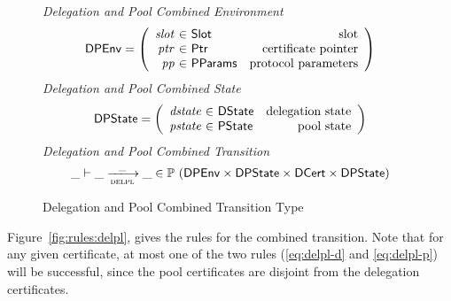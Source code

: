 \begin{figure}[hbt]
  \emph{Delegation and Pool Combined Environment}
  \begin{equation*}
    \DPEnv =
    \left(
      \begin{array}{r@{~\in~}lr}
        \var{slot} & \Slot & \text{slot}\\
        \var{ptr} & \Ptr & \text{certificate pointer}\\
        \var{pp} & \PParams & \text{protocol parameters}\\
      \end{array}
    \right)
  \end{equation*}
  \emph{Delegation and Pool Combined State}
  \begin{equation*}
    \DPState =
    \left(
      \begin{array}{r@{~\in~}lr}
        \var{dstate} & \DState & \text{delegation state}\\
        \var{pstate} & \PState & \text{pool state}\\
      \end{array}
    \right)
  \end{equation*}
  \emph{Delegation and Pool Combined Transition}
  \begin{equation*}
    \_ \vdash \_ \trans{delpl}{\_} \_ \in
      \powerset (
        \DPEnv \times \DPState \times \DCert \times \DPState)
  \end{equation*}
  \caption{Delegation and Pool Combined Transition Type}
  \label{fig:defs:delpl}
\end{figure}

\clearpage

Figure~\ref{fig:rules:delpl}, gives the rules for the combined transition.
Note that for any given certificate, at most one of the two rules
(\cref{eq:delpl-d} and \cref{eq:delpl-p})
will be successful, since the pool certificates are disjoint from the delegation certificates.


